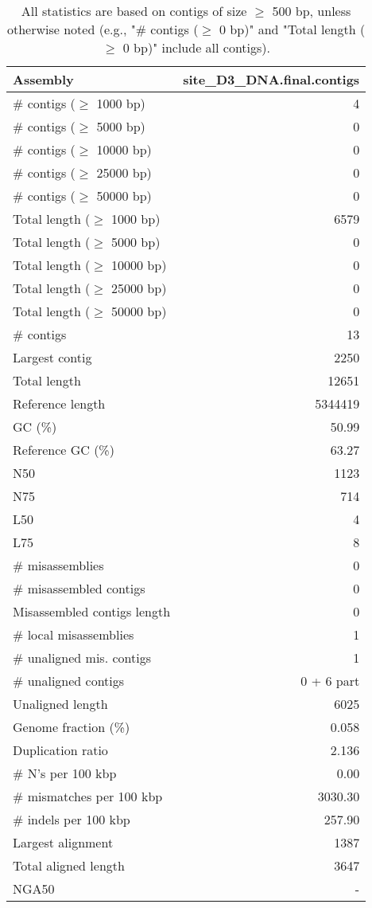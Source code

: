 \documentclass[12pt,a4paper]{article}
\begin{document}
\begin{table}[ht]
\begin{center}
\caption{All statistics are based on contigs of size $\geq$ 500 bp, unless otherwise noted (e.g., "\# contigs ($\geq$ 0 bp)" and "Total length ($\geq$ 0 bp)" include all contigs).}
\begin{tabular}{|l*{1}{|r}|}
\hline
Assembly & site\_D3\_DNA.final.contigs \\ \hline
\# contigs ($\geq$ 1000 bp) & 4 \\ \hline
\# contigs ($\geq$ 5000 bp) & 0 \\ \hline
\# contigs ($\geq$ 10000 bp) & 0 \\ \hline
\# contigs ($\geq$ 25000 bp) & 0 \\ \hline
\# contigs ($\geq$ 50000 bp) & 0 \\ \hline
Total length ($\geq$ 1000 bp) & 6579 \\ \hline
Total length ($\geq$ 5000 bp) & 0 \\ \hline
Total length ($\geq$ 10000 bp) & 0 \\ \hline
Total length ($\geq$ 25000 bp) & 0 \\ \hline
Total length ($\geq$ 50000 bp) & 0 \\ \hline
\# contigs & 13 \\ \hline
Largest contig & 2250 \\ \hline
Total length & 12651 \\ \hline
Reference length & 5344419 \\ \hline
GC (\%) & 50.99 \\ \hline
Reference GC (\%) & 63.27 \\ \hline
N50 & 1123 \\ \hline
N75 & 714 \\ \hline
L50 & 4 \\ \hline
L75 & 8 \\ \hline
\# misassemblies & 0 \\ \hline
\# misassembled contigs & 0 \\ \hline
Misassembled contigs length & 0 \\ \hline
\# local misassemblies & 1 \\ \hline
\# unaligned mis. contigs & 1 \\ \hline
\# unaligned contigs & 0 + 6 part \\ \hline
Unaligned length & 6025 \\ \hline
Genome fraction (\%) & 0.058 \\ \hline
Duplication ratio & 2.136 \\ \hline
\# N's per 100 kbp & 0.00 \\ \hline
\# mismatches per 100 kbp & 3030.30 \\ \hline
\# indels per 100 kbp & 257.90 \\ \hline
Largest alignment & 1387 \\ \hline
Total aligned length & 3647 \\ \hline
NGA50 & - \\ \hline
\end{tabular}
\end{center}
\end{table}
\end{document}

